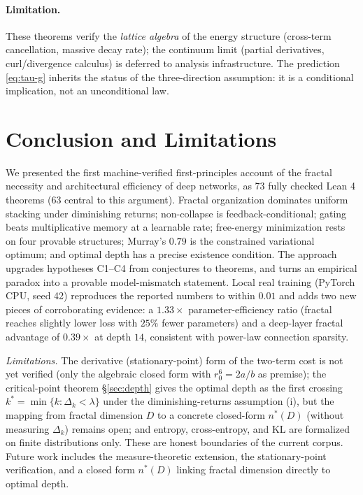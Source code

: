 \documentclass[journal]{IEEEtran}
\begin{document}
\paragraph{Limitation.}
These theorems verify the \emph{lattice algebra} of the energy structure
(cross-term cancellation, massive decay rate); the continuum limit (partial
derivatives, curl/divergence calculus) is deferred to analysis
infrastructure. The prediction \eqref{eq:tau-g} inherits the status of the
three-direction assumption: it is a conditional implication, not an
unconditional law.

\section{Conclusion and Limitations}
\label{sec:conclusion}
We presented the first machine-verified first-principles account of the
fractal necessity and architectural efficiency of deep networks, as 73 fully
checked Lean 4 theorems (63 central to this argument). Fractal organization
dominates uniform stacking under diminishing returns; non-collapse is
feedback-conditional; gating beats multiplicative memory at a learnable rate;
free-energy minimization rests on four provable structures; Murray's $0.79$ is
the constrained variational optimum; and optimal depth has a precise existence
condition. The approach upgrades hypotheses C1--C4 from conjectures to theorems,
and turns an empirical paradox into a provable model-mismatch statement. Local
real training (PyTorch CPU, seed 42) reproduces the reported numbers to within
$0.01$ and adds two new pieces of corroborating evidence: a $1.33\times$
parameter-efficiency ratio (fractal reaches slightly lower loss with $25\%$
fewer parameters) and a deep-layer fractal advantage of $0.39\times$ at depth
$14$, consistent with power-law connection sparsity.

\emph{Limitations.} The derivative (stationary-point) form of the two-term
cost is not yet verified (only the algebraic closed form with $r_0^6=2a/b$ as
premise); the critical-point theorem
\S\ref{sec:depth} gives the optimal depth as the first crossing
$k^*=\min\{k:\Delta_k<\lambda\}$ under the diminishing-returns assumption
(i), but the mapping from fractal dimension $D$ to a concrete closed-form
$n^*(D)$ (without measuring $\Delta_k$) remains open; and entropy,
cross-entropy, and KL are formalized on finite distributions only. These are
honest boundaries of the current corpus. Future work includes the
measure-theoretic extension, the stationary-point verification, and a
closed form $n^*(D)$ linking fractal dimension directly to optimal depth.
\end{document}
